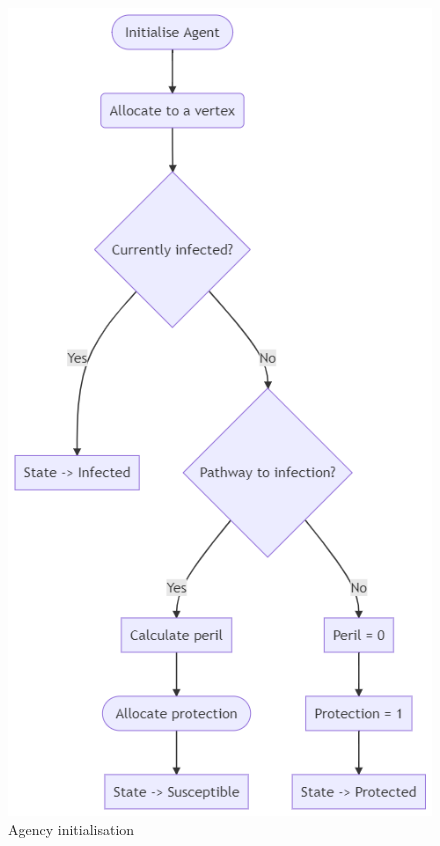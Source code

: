 \documentclass[../report.tex]{subfiles}
\begin{document}
\begin{figure}[ht]
  \centering
  \includegraphics[scale=0.4]{assets/agent-initialisation}
  \caption{Agency initialisation}
  \label{fig:agent}
\end{figure}
\end{document}
